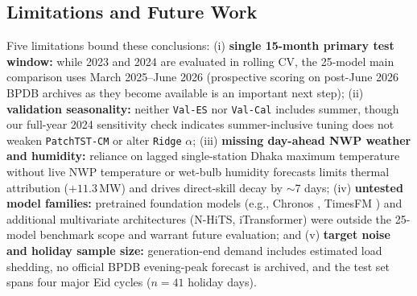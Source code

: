\documentclass[5p,twocolumn,authoryear]{elsarticle}
\begin{document}
\subsection{Limitations and Future Work}
Five limitations bound these conclusions: (i) \textbf{single 15-month primary test window:} while 2023 and 2024 are evaluated in rolling CV, the 25-model main comparison uses March 2025--June 2026 (prospective scoring on post-June 2026 BPDB archives as they become available is an important next step); (ii) \textbf{validation seasonality:} neither \texttt{Val-ES} nor \texttt{Val-Cal} includes summer, though our full-year 2024 sensitivity check indicates summer-inclusive tuning does not weaken \texttt{PatchTST-CM} or alter \texttt{Ridge} $\alpha$; (iii) \textbf{missing day-ahead NWP weather and humidity:} reliance on lagged single-station Dhaka maximum temperature without live NWP temperature or wet-bulb humidity forecasts limits thermal attribution ($+11.3$\,MW) and drives direct-skill decay by $\sim$7 days; (iv) \textbf{untested model families:} pretrained foundation models (e.g., Chronos \citep{ansari2024chronos}, TimesFM \citep{das2024timesfm}) and additional multivariate architectures (N-HiTS, iTransformer) were outside the 25-model benchmark scope and warrant future evaluation; and (v) \textbf{target noise and holiday sample size:} generation-end demand includes estimated load shedding, no official BPDB evening-peak forecast is archived, and the test set spans four major Eid cycles ($n=41$ holiday days).

\end{document}
